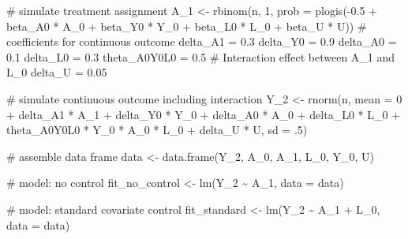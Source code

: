 \documentclass[
  singlecolumn]{article}
\newenvironment{Shaded}{}{}
\newcommand{\AttributeTok}[1]{\textcolor[rgb]{0.84,0.23,0.29}{#1}}
\newcommand{\CommentTok}[1]{\textcolor[rgb]{0.42,0.45,0.49}{#1}}
\newcommand{\DecValTok}[1]{\textcolor[rgb]{0.00,0.36,0.77}{#1}}
\newcommand{\FloatTok}[1]{\textcolor[rgb]{0.00,0.36,0.77}{#1}}
\newcommand{\FunctionTok}[1]{\textcolor[rgb]{0.44,0.26,0.76}{#1}}
\newcommand{\NormalTok}[1]{\textcolor[rgb]{0.14,0.16,0.18}{#1}}
\newcommand{\OtherTok}[1]{\textcolor[rgb]{0.44,0.26,0.76}{#1}}
\newcommand{\SpecialCharTok}[1]{\textcolor[rgb]{0.00,0.36,0.77}{#1}}
\begin{document}
\begin{Shaded}
\begin{Highlighting}[]
\CommentTok{\# simulate treatment assignment}
\NormalTok{A\_1 }\OtherTok{\textless{}{-}} \FunctionTok{rbinom}\NormalTok{(n, }\DecValTok{1}\NormalTok{, }\AttributeTok{prob =} \FunctionTok{plogis}\NormalTok{(}\SpecialCharTok{{-}}\FloatTok{0.5} \SpecialCharTok{+} 
\NormalTok{                                    beta\_A0 }\SpecialCharTok{*}\NormalTok{ A\_0 }\SpecialCharTok{+}
\NormalTok{                                    beta\_Y0 }\SpecialCharTok{*}\NormalTok{ Y\_0 }\SpecialCharTok{+} 
\NormalTok{                                    beta\_L0 }\SpecialCharTok{*}\NormalTok{ L\_0 }\SpecialCharTok{+} 
\NormalTok{                                    beta\_U }\SpecialCharTok{*}\NormalTok{ U))}
\CommentTok{\# coefficients for continuous outcome}
\NormalTok{delta\_A1 }\OtherTok{=} \FloatTok{0.3}
\NormalTok{delta\_Y0 }\OtherTok{=} \FloatTok{0.9}
\NormalTok{delta\_A0 }\OtherTok{=} \FloatTok{0.1}
\NormalTok{delta\_L0 }\OtherTok{=} \FloatTok{0.3}
\NormalTok{theta\_A0Y0L0 }\OtherTok{=} \FloatTok{0.5} \CommentTok{\# Interaction effect between A\_1 and L\_0}
\NormalTok{delta\_U }\OtherTok{=} \FloatTok{0.05}

\CommentTok{\# simulate continuous outcome including interaction}
\NormalTok{Y\_2 }\OtherTok{\textless{}{-}} \FunctionTok{rnorm}\NormalTok{(n,}
             \AttributeTok{mean =} \DecValTok{0} \SpecialCharTok{+}
\NormalTok{               delta\_A1 }\SpecialCharTok{*}\NormalTok{ A\_1 }\SpecialCharTok{+} 
\NormalTok{               delta\_Y0 }\SpecialCharTok{*}\NormalTok{ Y\_0 }\SpecialCharTok{+} 
\NormalTok{               delta\_A0 }\SpecialCharTok{*}\NormalTok{ A\_0 }\SpecialCharTok{+} 
\NormalTok{               delta\_L0 }\SpecialCharTok{*}\NormalTok{ L\_0 }\SpecialCharTok{+} 
\NormalTok{               theta\_A0Y0L0 }\SpecialCharTok{*}\NormalTok{ Y\_0 }\SpecialCharTok{*} 
\NormalTok{               A\_0 }\SpecialCharTok{*}\NormalTok{ L\_0 }\SpecialCharTok{+} 
\NormalTok{               delta\_U }\SpecialCharTok{*}\NormalTok{ U,}
             \AttributeTok{sd =}\NormalTok{ .}\DecValTok{5}\NormalTok{)}

\CommentTok{\# assemble data frame}
\NormalTok{data }\OtherTok{\textless{}{-}} \FunctionTok{data.frame}\NormalTok{(Y\_2, A\_0, A\_1, L\_0, Y\_0, U)}

\CommentTok{\# model: no control}
\NormalTok{fit\_no\_control }\OtherTok{\textless{}{-}} \FunctionTok{lm}\NormalTok{(Y\_2 }\SpecialCharTok{\textasciitilde{}}\NormalTok{ A\_1, }\AttributeTok{data =}\NormalTok{ data)}

\CommentTok{\# model: standard covariate control}
\NormalTok{fit\_standard }\OtherTok{\textless{}{-}} \FunctionTok{lm}\NormalTok{(Y\_2 }\SpecialCharTok{\textasciitilde{}}\NormalTok{ A\_1 }\SpecialCharTok{+}\NormalTok{ L\_0, }\AttributeTok{data =}\NormalTok{ data)}


\end{Highlighting}
\end{Shaded}
\end{document}
